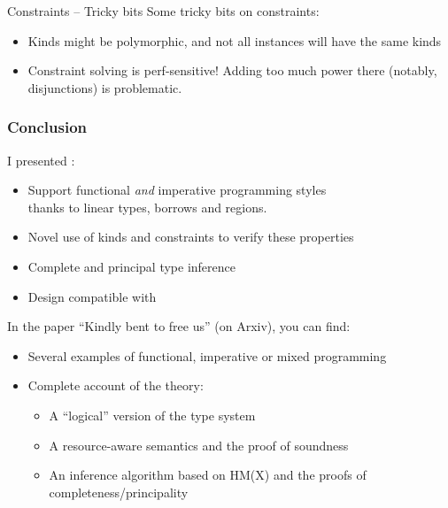 \documentclass[xcolor=svgnames,11pt]{beamer}
\begin{document}
\begin{frame}{Constraints -- Tricky bits}
  Some tricky bits on constraints:
  \begin{itemize}
  \item Kinds might be polymorphic, and not all instances will
    have the same kinds
  \item Constraint solving is perf-sensitive! Adding too much power
    there (notably, disjunctions) is problematic.
  \end{itemize}
  
\end{frame}




\begin{frame}
  \frametitle{Conclusion}

  I presented \lang:
  
  \begin{itemize}
  \item Support functional \emph{and} imperative programming styles\\
    thanks to linear types, borrows and regions.
  \item Novel use of kinds and constraints to verify these properties
  \item Complete and principal type inference
  \item Design compatible with \ocaml
  \end{itemize}\pause

  In the paper ``Kindly bent to free us'' (on Arxiv), you can find:
  \begin{itemize}
  \item Several examples of functional, imperative or mixed programming
  \item Complete account of the theory:
    \begin{itemize}
    \item A ``logical'' version of the type system
    \item A resource-aware semantics and the proof of soundness
    \item An inference algorithm based on HM(X) and the proofs of completeness/principality
    \end{itemize}
  \end{itemize}
\end{frame}
\end{document}
